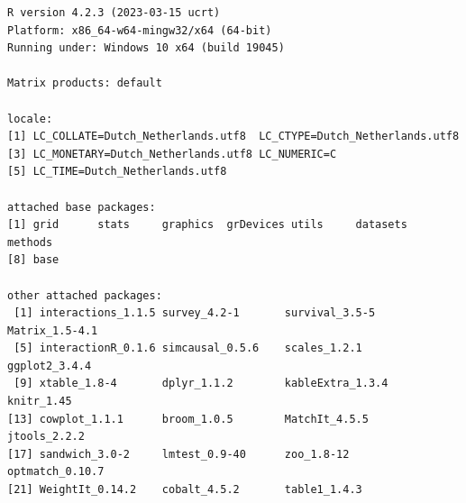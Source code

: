 \documentclass[
  letterpaper,
  DIV=11,
  numbers=noendperiod]{scrreprt}
\begin{document}
\begin{verbatim}
R version 4.2.3 (2023-03-15 ucrt)
Platform: x86_64-w64-mingw32/x64 (64-bit)
Running under: Windows 10 x64 (build 19045)

Matrix products: default

locale:
[1] LC_COLLATE=Dutch_Netherlands.utf8  LC_CTYPE=Dutch_Netherlands.utf8   
[3] LC_MONETARY=Dutch_Netherlands.utf8 LC_NUMERIC=C                      
[5] LC_TIME=Dutch_Netherlands.utf8    

attached base packages:
[1] grid      stats     graphics  grDevices utils     datasets  methods  
[8] base     

other attached packages:
 [1] interactions_1.1.5 survey_4.2-1       survival_3.5-5     Matrix_1.5-4.1    
 [5] interactionR_0.1.6 simcausal_0.5.6    scales_1.2.1       ggplot2_3.4.4     
 [9] xtable_1.8-4       dplyr_1.1.2        kableExtra_1.3.4   knitr_1.45        
[13] cowplot_1.1.1      broom_1.0.5        MatchIt_4.5.5      jtools_2.2.2      
[17] sandwich_3.0-2     lmtest_0.9-40      zoo_1.8-12         optmatch_0.10.7   
[21] WeightIt_0.14.2    cobalt_4.5.2       table1_1.4.3      


\end{verbatim}
\end{document}
